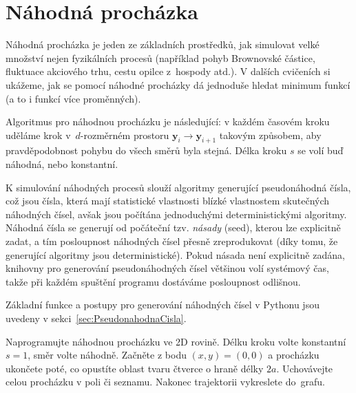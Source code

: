 \documentclass[a4paper,11pt,twoside]{article}
\def\vector#1{\boldsymbol{#1}}			%
\theoremstyle{red}
\theoremstyle{green}
\begin{document}
\section{Náhodná procházka}\label{sec:NahodnaProchazka}
    Náhodná procházka je jeden ze základních prostředků, jak simulovat velké množství nejen fyzikálních procesů (například pohyb Brownovské částice, fluktuace akciového trhu, cestu opilce z~hospody atd.).
    V dalších cvičeních si ukážeme, jak se pomocí náhodné procházky dá jednoduše hledat minimum funkcí (a to i funkcí více proměnných). 

    Algoritmus pro náhodnou procházku je následující: v každém časovém kroku uděláme krok v~$d$-rozměrném prostoru $\vector{y}_{i}\rightarrow\vector{y}_{i+1}$ takovým způsobem, aby pravděpodobnost pohybu do všech směrů byla stejná.
    Délka kroku $s$ se volí buď náhodná, nebo konstantní.

    K simulování náhodných procesů slouží algoritmy generující pseudonáhodná čísla, což jsou čísla, která mají statistické vlastnosti blízké vlastnostem skutečných náhodných čísel, avšak jsou počítána jednoduchými deterministickými algoritmy.
    Náhodná čísla se generují od počáteční tzv. \emph{násady} (seed), kterou lze explicitně zadat, a tím posloupnost náhodných čísel přesně zreprodukovat (díky tomu, že generující algoritmy jsou deterministické).
    Pokud násada není explicitně zadána, knihovny pro generování pseudonáhodných čísel většinou volí systémový čas, takže při každém spuštění programu dostáváme posloupnost odlišnou.

    Základní funkce a postupy pro generování náhodných čísel v Pythonu jsou uvedeny v sekci~\ref{sec:PseudonahodnaCisla}.

    \begin{solved}
        Naprogramujte náhodnou procházku ve 2D rovině.
        Délku kroku volte konstantní $s=1$, směr volte náhodně.
        Začněte z bodu $(x,y)=(0,0)$ a procházku ukončete poté, co opustíte oblast tvaru čtverce o hraně délky $2a$.
        Uchovávejte celou procházku v poli či seznamu.
        Nakonec trajektorii vykreslete do~grafu.
    \end{solved}
\end{document}
